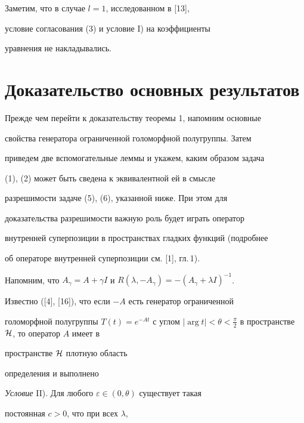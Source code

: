 Заметим, что в случае $l=1$, исследованном в [13],


условие согласования (3) и условие I) на коэффициенты


уравнения не накладывались.





\section{Доказательство основных результатов}





Прежде чем перейти к доказательству теоремы 1, напомним основные


свойства генератора ограниченной голоморфной полугруппы. Затем


приведем две вспомогательные леммы и укажем, каким образом задача


(1), (2) может быть сведена к эквивалентной ей в смысле


разрешимости задаче (5), (6), указанной ниже. При этом для


доказательства разрешимости важную роль будет играть оператор


внутренней суперпозиции в пространствах гладких функций (подробнее


об операторе внутренней суперпозиции см. [1], гл.\,1).





Напомним, что $A_{\gamma }=A+\gamma I$ и $R(\lambda


,-A_{\gamma })=-(A_{\gamma }+\lambda I)^{-1}$.





Известно ([4], [16]), что если $-A$ есть генератор ограниченной


голоморфной полугруппы $T(t)=e^{-At}$ с углом $|\arg t|<\theta


< \frac{\pi }{2}$ в пространстве $\pH$, то оператор $A$ имеет в


пространстве ${\cal H}$ плотную область


определения и выполнено


\medskip





{\it Условие} II). Для любого $\varepsilon \in (0,\theta)$ существует такая


постоянная $c>0$, что при всех $\lambda$,


